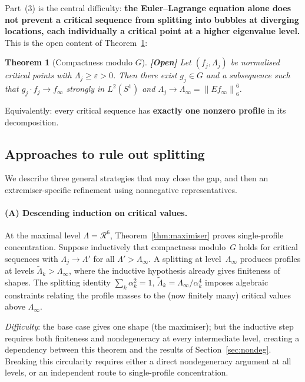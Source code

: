 \documentclass[12pt]{article}
\newtheorem{theorem}{Theorem}[section]
\theoremstyle{definition}
\theoremstyle{remark}
\newcommand{\norm}[1]{\left\|#1\right\|}
\newcommand{\open}{\textbf{\color{red}[Open]}}
\begin{document}
Part~(3) is the central difficulty:
\textbf{the Euler--Lagrange equation alone does not prevent a critical
sequence from splitting into bubbles at diverging locations, each
individually a critical point at a higher eigenvalue level.}
This is the open content of Theorem~\ref{thm:compactness-mod-G}:

\begin{theorem}[Compactness modulo $G$]
  \label{thm:compactness-mod-G}
  \open\quad
  Let $(f_j,\Lambda_j)$ be normalised critical points with
  $\Lambda_j\geq\varepsilon>0$.  Then there exist $g_j\in G$ and a
  subsequence such that $g_j\cdot f_j\to f_\infty$ strongly in
  $L^2(S^1)$ and $\Lambda_j\to\Lambda_\infty=\norm{Ef_\infty}_6^6$.
\end{theorem}

Equivalently: every critical sequence has \textbf{exactly one
nonzero profile} in its decomposition.

\subsection{Approaches to rule out splitting}

We describe three general strategies that may close the gap, and then an
extremiser-specific refinement using nonnegative representatives.

\paragraph{(A) Descending induction on critical values.}
At the maximal level $\Lambda=\mathcal R^6$,
Theorem~\ref{thm:maximiser} proves single-profile concentration.
Suppose inductively that compactness modulo~$G$ holds for critical
sequences with $\Lambda_j\to\Lambda'$ for all
$\Lambda'>\Lambda_\infty$.  A splitting at level~$\Lambda_\infty$
produces profiles at levels $\widetilde\Lambda_k>\Lambda_\infty$,
where the inductive hypothesis already gives finiteness of shapes.
The splitting identity $\sum_k\alpha_k^2=1$,
$\widetilde\Lambda_k=\Lambda_\infty/\alpha_k^4$ imposes algebraic
constraints relating the profile masses to the (now finitely many)
critical values above $\Lambda_\infty$.

\emph{Difficulty}: the base case gives one shape (the maximiser);
but the inductive step requires both finiteness and nondegeneracy at
every intermediate level, creating a dependency between this theorem
and the results of Section~\ref{sec:nondeg}.  Breaking this
circularity requires either a direct nondegeneracy argument at all
levels, or an independent route to single-profile concentration.
\end{document}
